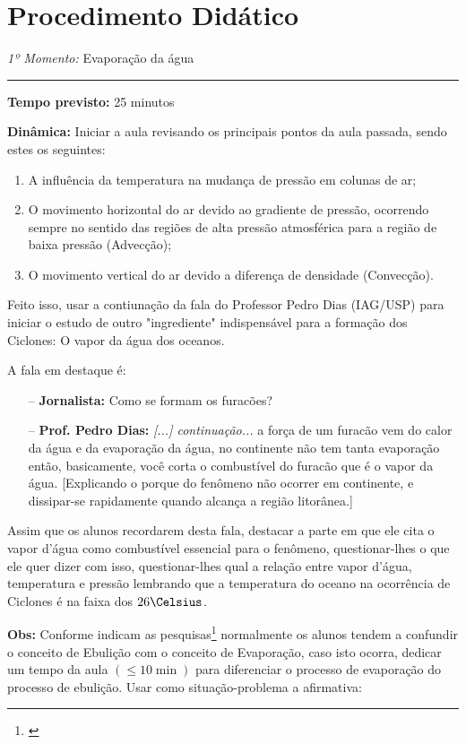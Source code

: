 \section*{Procedimento Didático} 
\noindent\emph{1º Momento:} Evaporação da água
\par\noindent\rule{.3\textwidth}{.5pt}  
\par\noindent\textbf{Tempo previsto:} 25 minutos

\noindent\textbf{Dinâmica:} Iniciar a aula revisando os principais pontos da aula passada, sendo estes os seguintes:
\begin{enumerate}[label=\alph *)]
		\item A influência da temperatura na mudança de pressão em colunas de ar;
		\item O movimento horizontal do ar devido ao gradiente de pressão, ocorrendo sempre no sentido das regiões de alta pressão atmosférica para a região de baixa pressão (Advecção);
		\item O movimento vertical do ar devido a diferença de densidade (Convecção). 
\end{enumerate}

Feito isso, usar a contiunação da fala do Professor Pedro Dias (IAG/USP) para iniciar o estudo de outro "ingrediente" indispensável para a formação dos Ciclones: O vapor da água dos oceanos.

A fala em destaque é:

\begin{itemize}
	\item[--] \textbf{Jornalista:} Como se formam os furacões?
	\item[--] \textbf{Prof. Pedro Dias:} \textit{[...] continuação...} a força de um furacão vem do calor da água e da evaporação da água, no continente não tem tanta evaporação então, basicamente, você corta o combustível do furacão que é o vapor da água. [Explicando o porque do fenômeno não ocorrer em continente, e dissipar-se rapidamente quando alcança a região litorânea.]
\end{itemize}

Assim que os alunos recordarem desta fala, destacar a parte em que ele cita o vapor d'água como combustível essencial para o fenômeno, questionar-lhes o que ele quer dizer com isso, questionar-lhes qual a relação entre vapor d'água, temperatura e pressão lembrando que a temperatura do oceano na ocorrência de Ciclones é na faixa dos $26\Celsius$.

\noindent\textbf{Obs:} Conforme indicam as pesquisas\footnote{\cite{LANG:2016}} normalmente os alunos tendem a confundir o conceito de Ebulição com o conceito de Evaporação, caso isto ocorra, dedicar um tempo da aula $(\leq 10\min)$ para diferenciar o processo de evaporação do processo de ebulição. Usar como situação-problema a afirmativa:

